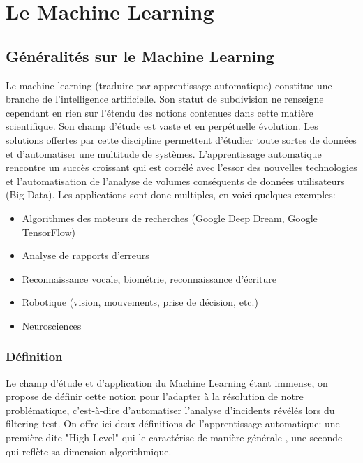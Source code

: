 \chapter{ Le  Machine Learning}
\label{Le Machine Learning}
\thispagestyle{fancy}

\section{Généralités sur le Machine Learning}
\label{Le Machine Learning: Généralités sur le Machine Learning}
Le machine learning (traduire par apprentissage automatique) constitue une branche de l'intelligence artificielle. Son statut de subdivision ne renseigne cependant en rien sur l'étendu des notions contenues dans cette matière scientifique. Son champ d'étude est vaste et en perpétuelle évolution. Les solutions offertes par cette discipline permettent d'étudier toute sortes de données et d'automatiser une multitude de systèmes. L'apprentissage automatique rencontre un succès croissant qui est corrélé avec l'essor des nouvelles technologies et l'automatisation de l'analyse de volumes conséquents de données utilisateurs (Big Data). Les applications sont donc multiples, en voici quelques exemples:  

\begin{itemize}
	\item Algorithmes des moteurs de recherches (Google Deep Dream, Google TensorFlow)
	\item Analyse de rapports d'erreurs
	\item Reconnaissance vocale, biométrie, reconnaissance d'écriture
	\item Robotique (vision, mouvements, prise de décision, etc.)
	\item Neurosciences 
\end{itemize}

\subsection{Définition}
\label{Le Machine Learning: Les différents algorithmes: Définition}
Le champ d'étude et d'application du Machine Learning étant immense, on propose de définir cette notion pour l'adapter à la résolution de notre problématique, c'est-à-dire d'automatiser l'analyse d'incidents révélés lors du filtering test.
On offre ici deux définitions de l'apprentissage automatique: une première dite "High Level" qui le caractérise de manière générale , une seconde qui reflète sa dimension algorithmique. 


